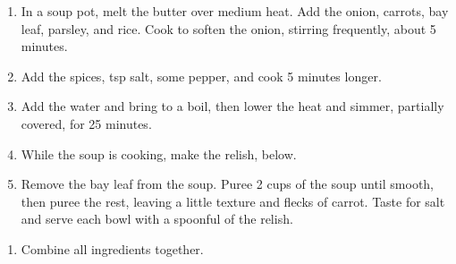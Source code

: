

\begin{ingredients}
\end{ingredients}


\begin{recipe}
  \begin{enumerate}

  \item In a soup pot, melt the butter over medium heat.  Add the
    onion, carrots, bay leaf, parsley, and rice.  Cook to soften the
    onion, stirring frequently, about 5 minutes.

  \item Add the spices, \fracH tsp salt, some pepper, and cook 5
    minutes longer.

  \item Add the water and bring to a boil, then lower the heat and
    simmer, partially covered, for 25 minutes.

  \item While the soup is cooking, make the relish, below.

  \item Remove the bay leaf from the soup.  Puree 2 cups of the soup
    until smooth, then puree the rest, leaving a little texture and
    flecks of carrot.  Taste for salt and serve each bowl with a
    spoonful of the relish.
  \end{enumerate}
\end{recipe}



\begin{ingredients}
\end{ingredients}


\begin{recipe}
  \begin{enumerate}

  \item Combine all ingredients together.

  \end{enumerate}
\end{recipe}
